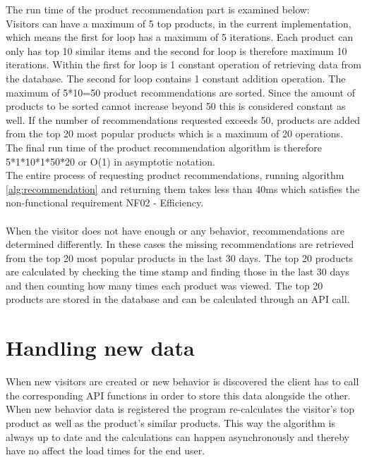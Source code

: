 The run time of the product recommendation part is examined below: \\
Visitors can have a maximum of 5 top products, in the current implementation, which means the first for loop has a maximum of 5 iterations. 
Each product can only has top 10 similar items and the second for loop is therefore maximum 10 iterations.
Within the first for loop is 1 constant operation of retrieving data from the database. The second for loop contains 1 constant addition operation.
The maximum of 5*10=50 product recommendations are sorted. Since the amount of products to be sorted cannot increase beyond 50 this is considered constant as well.
If the number of recommendations requested exceeds 50, products are added from the top 20 most popular products which is a maximum of 20 operations.
The final run time of the product recommendation algorithm is therefore 5*1*10*1*50*20 or O(1) in asymptotic notation. \\
The entire process of requesting product recommendations, running algorithm \ref{alg:recommendation} and returning them takes less than 40ms which satisfies the non-functional requirement NF02 - Efficiency. \\\\
When the visitor does not have enough or any behavior, recommendations are determined differently. In these cases the missing recommendations are retrieved from the top 20 most popular products in the last 30 days. The top 20 products are calculated by checking the time stamp and finding those in the last 30 days and then counting how many times each product was viewed. The top 20 products are stored in the database and can be calculated through an API call.

\section{Handling new data}
When new visitors are created or new behavior is discovered the client has to call the corresponding API functions in order to store this data alongside the other. When new behavior data is registered the program re-calculates the visitor's top product as well as the product's similar products. This way the algorithm is always up to date and the calculations can happen asynchronously and thereby have no affect the load times for the end user.

